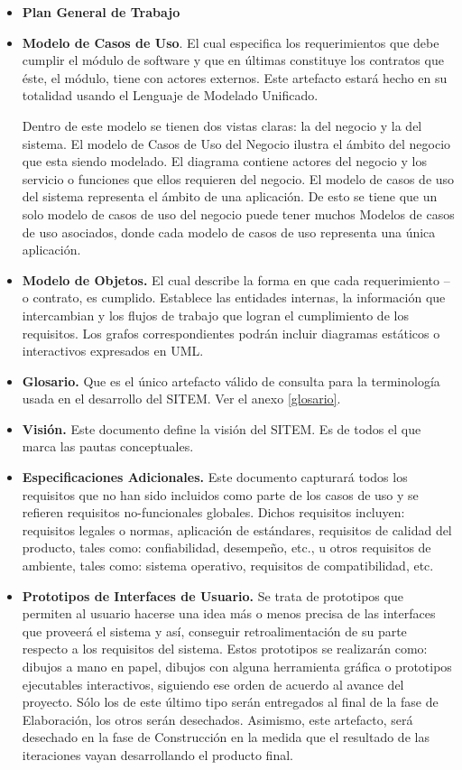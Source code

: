 \begin{itemize}
\item \textbf{Plan General de Trabajo}
\item \textbf{Modelo de Casos de Uso}. El cual especifica los requerimientos que debe cumplir el módulo de software y que en últimas constituye los contratos que éste, el módulo, tiene con actores externos. Este artefacto estará hecho en su totalidad usando el Lenguaje de Modelado Unificado. 

Dentro de este modelo se tienen dos vistas claras: la del negocio y la del sistema. El modelo de Casos de Uso del Negocio ilustra el ámbito del negocio que esta siendo modelado. El diagrama contiene actores del negocio y los servicio o funciones que ellos requieren del negocio. El modelo de casos de uso del sistema representa el ámbito de una aplicación. De esto se tiene que un solo modelo de casos de uso del negocio puede tener muchos Modelos de casos de uso asociados, donde cada modelo de casos de uso representa una única aplicación.

\item \textbf{Modelo de Objetos.} El cual describe la forma en que cada requerimiento – o contrato,  es cumplido. Establece las entidades internas, la información que intercambian y los flujos de trabajo que logran el cumplimiento de los requisitos. Los grafos correspondientes podrán incluir diagramas estáticos o interactivos expresados en UML.

\item \textbf{Glosario.} Que es el único artefacto válido de consulta para la terminología usada en el desarrollo del SITEM. Ver el anexo \ref{glosario}.

\item \textbf{Visión.} Este documento define la visión del SITEM. Es de todos el que marca las pautas conceptuales. 

\item \textbf{Especificaciones Adicionales.} Este documento capturará todos los requisitos que no han sido incluidos como parte de los casos de uso y se refieren requisitos no-funcionales globales. Dichos requisitos incluyen: requisitos legales o normas, aplicación de estándares, requisitos de calidad del producto, tales como: confiabilidad, desempeño, etc., u otros requisitos de ambiente, tales como: sistema operativo, requisitos de compatibilidad, etc. 

\item \textbf{Prototipos de Interfaces de Usuario.} Se trata de prototipos que permiten al usuario hacerse una idea más o menos precisa de las interfaces que proveerá el sistema y así, conseguir retroalimentación de su parte respecto a los requisitos del sistema. Estos prototipos se realizarán como: dibujos a mano en papel, dibujos con alguna herramienta gráfica o prototipos ejecutables interactivos, siguiendo ese orden de acuerdo al avance del proyecto. Sólo los de este último tipo serán entregados al final de la fase de Elaboración, los otros serán desechados. Asimismo, este artefacto, será desechado en la fase de Construcción en la medida que el resultado de las iteraciones vayan desarrollando el producto final. 


\end{itemize}
